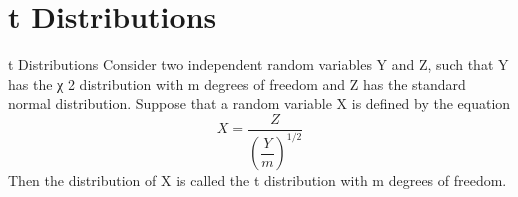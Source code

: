 \documentclass[../../main.tex]{subfiles}
\begin{document}
\section{t Distributions}
\begin{definition}{t Distributions}{}
Consider two independent random variables Y and Z, such that Y has the χ 2 distribution with m degrees of freedom and Z has the standard normal distribution. Suppose that a random variable X is deﬁned by the equation
\begin{equation}\label{}
X = \dfrac{Z}{(\dfrac{Y}{m})^{1/2}}
\end{equation}
Then the distribution of X is called the t distribution with m degrees of freedom.

\end{definition}
\end{document}
